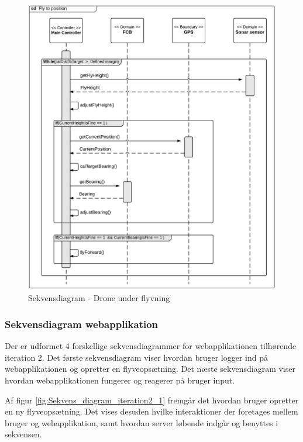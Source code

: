 \begin{figure}[H]
	\centering
	\includegraphics[width=1\textwidth]{Billeder/sekvens/sekvens_iteration2_3}
	\caption{Sekvensdiagram - Drone under flyvning}
	\label{fig:Sekvens_diagram_iteration2_3}
\end{figure}




\newpage
\subsubsection*{Sekvensdiagram webapplikation}
\vspace{-0.1cm}

Der er udformet 4 forskellige sekvensdiagrammer for webapplikationen tilhørende iteration 2. Det første sekvensdiagram viser hvordan bruger logger ind på webapplikationen og opretter en flyveopsætning. Det næste sekvensdiagram viser hvordan webapplikationen fungerer og reagerer på bruger input.


Af figur \ref{fig:Sekvens_diagram_iteration2_1} fremgår det hvordan bruger opretter en ny flyveopsætning. Det vises desuden hvilke interaktioner der foretages mellem bruger og webapplikation, samt hvordan server løbende indgår og benyttes i sekvensen. 

